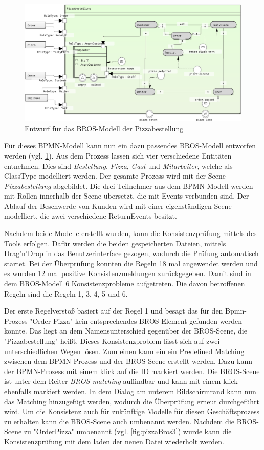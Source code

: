 \begin{figure}
    \centering
    \includegraphics[width=\textwidth,keepaspectratio]{../images/example/bros-rule1.png}%
    \caption{Entwurf für das BROS-Modell der Pizzabestellung}%
    \label{fig:pizzaBros1}
\end{figure}

Für dieses BPMN-Modell kann nun ein dazu passendes BROS-Modell entworfen werden (vgl. \cref{fig:pizzaBros1}).
Aus dem Prozess lassen sich vier verschiedene Entitäten entnehmen.
Dies sind \emph{Bestellung}, \emph{Pizza}, \emph{Gast} und \emph{Mitarbeiter}, welche als ClassType modelliert werden.
Der gesamte Prozess wird mit der Scene \emph{Pizzabestellung} abgebildet.
Die drei Teilnehmer aus dem BPMN-Modell werden mit Rollen innerhalb der Scene übersetzt, die mit Events verbunden sind.
Der Ablauf der Beschwerde von Kunden wird mit einer eigenständigen Scene modelliert, die zwei verschiedene ReturnEvents besitzt.

Nachdem beide Modelle erstellt wurden, kann die Konsistenzprüfung mittels des Tools erfolgen.
Dafür werden die beiden gespeicherten Dateien, mittels Drag'n'Drop in das Benutzerinterface gezogen, wodurch die Prüfung automatisch startet.
Bei der Überprüfung konnten die Regeln 18 mal angewendet werden und es wurden 12 mal positive Konsistenzmeldungen zurückgegeben.
Damit sind in dem BROS-Modell 6 Konsistenzprobleme aufgetreten.
Die davon betroffenen Regeln sind die Regeln 1, 3, 4, 5 und 6.

Der erste Regelverstoß basiert auf der Regel 1 und besagt das für den Bpmn-Prozess "Order Pizza" kein entsprechendes BROS-Element gefunden werden konnte.
Das liegt an dem Namensunterschied gegenüber der BROS-Scene, die "Pizzabestellung" heißt.
Dieses Konsistenzproblem lässt sich auf zwei unterschiedlichen Wegen lösen.
Zum einen kann ein ein Predefined Matching zwischen dem BPMN-Prozess und der BROS-Scene erstellt werden.
Dazu kann der BPMN-Prozess mit einem klick auf die ID markiert werden.
Die BROS-Scene ist unter dem Reiter \emph{BROS matching} auffindbar und kann mit einem klick ebenfalls markiert werden.
In dem Dialog am unterem Bildschirmrand kann nun das Matching hinzugefügt werden, wodurch die Überprüfung erneut durchgeführt wird.
Um die Konsistenz auch für zukünftige Modelle für diesen Geschäftsprozess zu erhalten kann die BROS-Scene auch umbenannt werden.
Nachdem die BROS-Scene zu "OrderPizza" umbenannt (vgl. \cref{fig:pizzaBros3}) wurde kann die Konsistenzprüfung mit dem laden der neuen Datei wiederholt werden.

